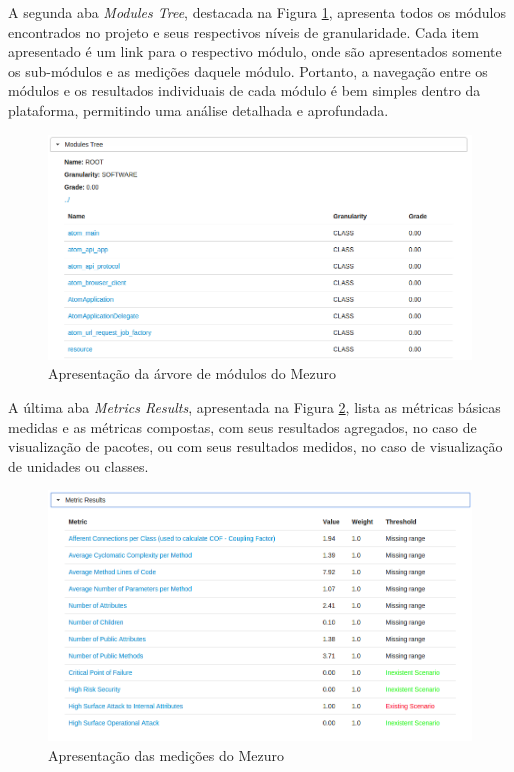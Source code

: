A segunda aba \emph{Modules Tree}, destacada na Figura \ref{modules_info}, apresenta todos os módulos encontrados no projeto e seus respectivos níveis de granularidade. Cada item apresentado é um link para o respectivo módulo, onde são apresentados somente os sub-módulos e as medições daquele módulo. Portanto, a navegação entre os módulos e os resultados individuais de cada módulo é bem simples dentro da plataforma, permitindo uma análise detalhada e aprofundada.

\begin{figure}
	\centering
		\includegraphics[scale=0.5]{figuras/modules_info}
		\caption{Apresentação da árvore de módulos do Mezuro}
		\label{modules_info}
\end{figure}

A última aba \emph{Metrics Results}, apresentada na Figura \ref{metrics_info}, lista as métricas básicas medidas e as métricas compostas, com seus resultados agregados, no caso de visualização de pacotes, ou com seus resultados medidos, no caso de visualização de unidades ou classes. 

\begin{figure}
	\centering
		\includegraphics[scale=0.5]{figuras/metrics_info}
		\caption{Apresentação das medições do Mezuro}
		\label{metrics_info}
\end{figure}

